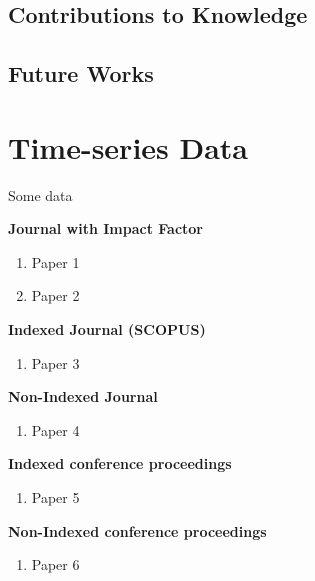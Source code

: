 \documentclass{utmthesis}
\begin{document}
\section{Contributions to Knowledge}
\section{Future Works}

%



\appendix
\chapter{Time-series Data}
Some data

\listofpublications

\noindent \textbf{Journal with Impact Factor}
\begin{enumerate}
\item Paper 1
\item Paper 2
\end{enumerate}
\textbf{Indexed Journal (SCOPUS)}
\begin{enumerate}
\item Paper 3
\end{enumerate}
\noindent \textbf{Non-Indexed Journal}
\begin{enumerate}
\item Paper 4
\end{enumerate}
\noindent \textbf{Indexed conference proceedings}
\begin{enumerate}
\item Paper 5
\end{enumerate}
\noindent \textbf{Non-Indexed conference proceedings}
\begin{enumerate}
\item Paper 6
\end{enumerate}
\endmatter
\end{document}
